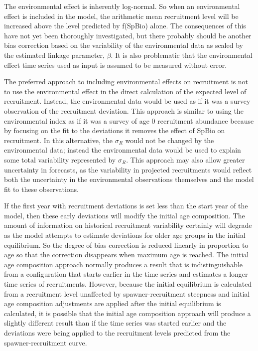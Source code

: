The environmental effect is inherently log-normal. So when an environmental effect is included in the model, the arithmetic mean recruitment level will be increased above the level predicted by f(SpBio) alone. The consequences of this have not yet been thoroughly investigated, but there probably should be another bias correction based on the variability of the environmental data as scaled by the estimated linkage parameter, $\beta$. It is also problematic that the environmental effect time series used as input is assumed to be measured without error.

The preferred approach to including environmental effects on recruitment is not to use the environmental effect in the direct calculation of the expected level of recruitment. Instead, the environmental data would be used as if it was a survey observation of the recruitment deviation. This approach is similar to using the environmental index as if it was a survey of age 0 recruitment abundance because by focusing on the fit to the deviations it removes the effect of SpBio on recruitment. In this alternative, the $\sigma_R$ would not be changed by the environmental data; instead the environmental data would be used to explain some total variability represented by $\sigma_R$. This approach may also allow greater uncertainty in forecasts, as the variability in projected recruitments would reflect both the uncertainty in the environmental observations themselves and the model fit to these observations.

If the first year with recruitment deviations is set less than the start year of the model, then these early deviations will modify the initial age composition. The amount of information on historical recruitment variability certainly will degrade as the model attempts to estimate deviations for older age groups in the initial equilibrium. So the degree of bias correction is reduced linearly in proportion to age so that the correction disappears when maximum age is reached. The initial age composition approach normally produces a result that is indistinguishable from a configuration that starts earlier in the time series and estimates a longer time series of recruitments. However, because the initial equilibrium is calculated from a recruitment level unaffected by spawner-recruitment steepness and initial age composition adjustments are applied after the initial equilibrium is calculated, it is possible that the initial age composition approach will produce a slightly different result than if the time series was started earlier and the deviations were being applied to the recruitment levels predicted from the spawner-recruitment curve. 
